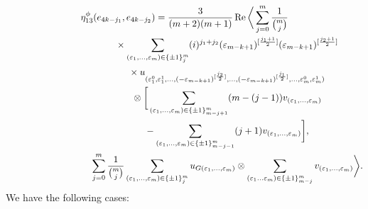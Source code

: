 \documentclass[pdftex]{sigma}
\numberwithin{equation}{section}
\begin{document}
\begin{gather*}
\eta_{13}^\phi(e_{4k-j_1},e_{4k-j_2})=
 \frac{3}{(m+2)(m+1)}\operatorname{Re}\bigg\langle \sum_{j=0}^{m}\frac{1}{{m\choose j}}\\
 \hphantom{\eta_{13}^\phi(e_{4k-j_1},e_{4k-j_2})=}{}\times
 \sum_{(\varepsilon_{1},\dots, \varepsilon_{m})\in\{\pm
1\}_{j}^{m}}(i)^{j_1+j_2}(\varepsilon_{m-k+1})^{[\frac{j_1+1}{2}]}(\varepsilon_{m-k+1})^{[\frac{j_2+1}{2}]} \\
 \hphantom{\eta_{13}^\phi(e_{4k-j_1},e_{4k-j_2})=}{}\times
 u_{(\varepsilon_{1}^0, \varepsilon_{1}^1, \dots, (-\varepsilon_{m-k+1})^{[\frac{j_2}{2}]} ,\dots, (-\varepsilon_{m-k+1})^{[\frac{j_1}{2}]},\dots, \varepsilon_{m}^0,\varepsilon_{m}^1)}\\
\hphantom{\eta_{13}^\phi(e_{4k-j_1},e_{4k-j_2})=}{} \otimes
 \bigg[ \sum_{(\varepsilon_{1},\dots, \varepsilon_{m})\in\{\pm
1\}_{m-j+1}^{m}}(m-(j-1))v_{(\varepsilon_{1},\dots,\varepsilon_m)}\\
\hphantom{\eta_{13}^\phi(e_{4k-j_1},e_{4k-j_2})=}{}
-\sum_{(\varepsilon_{1},\dots, \varepsilon_{m})\in\{\pm
1\}_{m-j-1}^{m}}(j+1)v_{(\varepsilon_{1},\dots,\varepsilon_m)}\bigg],\\
\hphantom{\eta_{13}^\phi(e_{4k-j_1},e_{4k-j_2})=}{}
 \sum_{j=0}^{m}\frac{1}{{m\choose j}}\sum_{(\varepsilon_{1},\dots, \varepsilon_{m})\in\{\pm
1\}_{j}^{m}}u_{G(\varepsilon_1,\dots,\varepsilon_m)}\otimes
\sum_{(\varepsilon_{1}\dots \varepsilon_{m})\in\{\pm 1\}_{m-j}^{m}}v_{(\varepsilon_1,\dots,\varepsilon_m)}\bigg\rangle.
\end{gather*}
We have the following cases:
\end{document}
